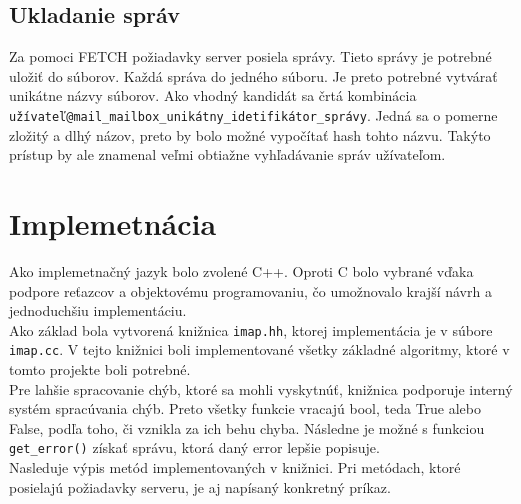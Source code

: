 \documentclass{article}
\begin{document}
\subsection{Ukladanie správ}
Za pomoci FETCH požiadavky server posiela správy. Tieto správy je potrebné uložiť do súborov. Každá správa do jedného súboru. Je preto potrebné vytvárať unikátne názvy súborov. Ako vhodný kandidát sa črtá kombinácia \texttt{užívateľ@mail\_mailbox\_unikátny\_idetifikátor\_správy}. Jedná sa o pomerne zložitý a dlhý názov, preto by bolo možné vypočítať hash tohto názvu. Takýto prístup by ale znamenal veľmi obtiažne vyhľadávanie správ užívateľom.

\section{Implemetnácia}
Ako implemetnačný jazyk bolo zvolené C++. Oproti C bolo vybrané vďaka podpore reťazcov a objektovému programovaniu, čo umožnovalo krajší návrh a jednoduchšiu implementáciu.\\
Ako základ bola vytvorená knižnica \texttt{imap.hh}, ktorej implementácia je v súbore \texttt{imap.cc}. V tejto knižnici boli implementované všetky základné algoritmy, ktoré v tomto projekte boli potrebné.\\
Pre lahšie spracovanie chýb, ktoré sa mohli vyskytnúť, knižnica podporuje interný systém spracúvania chýb. Preto všetky funkcie vracajú bool, teda True alebo False, podľa toho, či vznikla za ich behu chyba. Následne je možné s funkciou \texttt{get\_error()} získať správu, ktorá daný error lepšie popisuje.\\
Nasleduje výpis metód implementovaných v knižnici. Pri metódach, ktoré posielajú požiadavky serveru, je aj napísaný konkretný príkaz.\\
\end{document}
